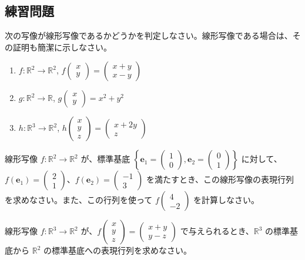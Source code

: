 \subsection{練習問題}

\begin{quiz}
次の写像が線形写像であるかどうかを判定しなさい。線形写像である場合は、その証明も簡潔に示しなさい。
\begin{enumerate}
\item $f: \mathbb{R}^2 \to \mathbb{R}^2$, $f\begin{pmatrix} x \\ y \end{pmatrix} = \begin{pmatrix} x+y \\ x-y \end{pmatrix}$
\item $g: \mathbb{R}^2 \to \mathbb{R}$, $g\begin{pmatrix} x \\ y \end{pmatrix} = x^2 + y^2$
\item $h: \mathbb{R}^3 \to \mathbb{R}^2$, $h\begin{pmatrix} x \\ y \\ z \end{pmatrix} = \begin{pmatrix} x+2y \\ z \end{pmatrix}$
\end{enumerate}
\end{quiz}

\begin{quiz}
線形写像 $f: \mathbb{R}^2 \to \mathbb{R}^2$ が、標準基底 $\left\{ \bm{e}_1=\begin{pmatrix} 1 \\ 0 \end{pmatrix}, \bm{e}_2=\begin{pmatrix} 0 \\ 1 \end{pmatrix} \right\}$ に対して、$f(\bm{e}_1) = \begin{pmatrix} 2 \\ 1 \end{pmatrix}$、$f(\bm{e}_2) = \begin{pmatrix} -1 \\ 3 \end{pmatrix}$ を満たすとき、この線形写像の表現行列を求めなさい。また、この行列を使って $f\begin{pmatrix} 4 \\ -2 \end{pmatrix}$ を計算しなさい。
\end{quiz}

\begin{quiz}
線形写像 $f: \mathbb{R}^3 \to \mathbb{R}^2$ が、$f\begin{pmatrix} x \\ y \\ z \end{pmatrix} = \begin{pmatrix} x+y \\ y-z \end{pmatrix}$ で与えられるとき、$\mathbb{R}^3$ の標準基底から $\mathbb{R}^2$ の標準基底への表現行列を求めなさい。
\end{quiz}
